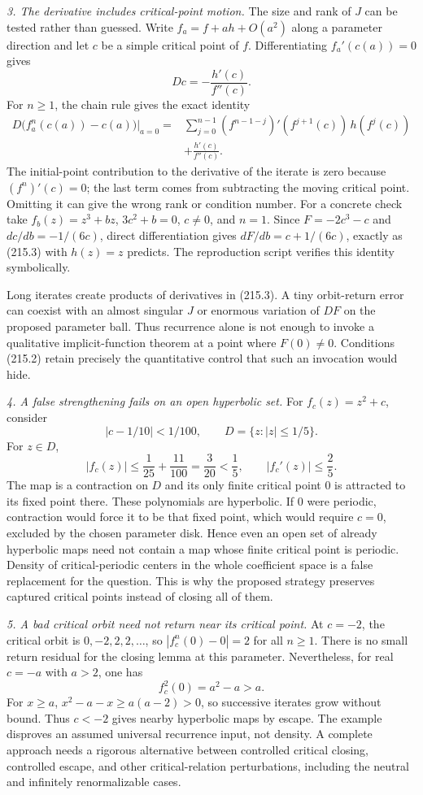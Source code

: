 \documentclass[11pt,a4paper]{article}
\begin{document}
\textit{3. The derivative includes critical-point motion.}
The size and rank of $J$ can be tested rather than guessed. Write
$f_a=f+ah+O(a^2)$ along a parameter direction and let $c$ be a simple
critical point of $f$. Differentiating $f_a'(c(a))=0$ gives
\[
 Dc=-\frac{h'(c)}{f''(c)}.
\]
For $n\ge1$, the chain rule gives the exact identity
\[
 \begin{split}
 D\big(f_a^n(c(a))-c(a)\big)\big|_{a=0}
   ={}&\sum_{j=0}^{n-1}
      (f^{n-1-j})'(f^{j+1}(c))\,h(f^j(c))\\
     &+\frac{h'(c)}{f''(c)}.                              \end{split}\tag{215.3}
\]
The initial-point contribution to the derivative of the iterate is zero
because $(f^n)'(c)=0$; the last term comes from subtracting the moving
critical point. Omitting it can give the wrong rank or condition number.
For a concrete check take $f_b(z)=z^3+bz$, $3c^2+b=0$, $c\ne0$, and
$n=1$. Since $F=-2c^3-c$ and $dc/db=-1/(6c)$, direct differentiation gives
$dF/db=c+1/(6c)$, exactly as (215.3) with $h(z)=z$ predicts.
The reproduction script verifies this identity symbolically.

Long iterates create products of derivatives in (215.3). A tiny orbit-return
error can coexist with an almost singular $J$ or enormous variation of
$DF$ on the proposed parameter ball. Thus recurrence alone is not enough
to invoke a qualitative implicit-function theorem at a point where
$F(0)\ne0$. Conditions (215.2) retain precisely the quantitative control
that such an invocation would hide.

\textit{4. A false strengthening fails on an open hyperbolic set.}
For $f_c(z)=z^2+c$, consider
\[
 |c-1/10|<1/100,\qquad D=\{z:|z|\le1/5\}.
\]
For $z\in D$,
\[
 |f_c(z)|\le\frac1{25}+\frac{11}{100}=\frac3{20}<\frac15,
 \qquad |f_c'(z)|\le\frac25.
\]
The map is a contraction on $D$ and its only finite critical point $0$
is attracted to its fixed point there. These polynomials are hyperbolic.
If $0$ were periodic, contraction would force it to be that fixed point,
which would require $c=0$, excluded by the chosen parameter disk.
Hence even an open set of already hyperbolic maps need not contain a map
whose finite critical point is periodic. Density of critical-periodic
centers in the whole coefficient space is a false replacement for the
question. This is why the proposed strategy preserves captured critical
points instead of closing all of them.

\textit{5. A bad critical orbit need not return near its critical point.}
At $c=-2$, the critical orbit is $0,-2,2,2,\ldots$, so
$|f_c^n(0)-0|=2$ for all $n\ge1$. There is no small return residual
for the closing lemma at this parameter. Nevertheless, for real
$c=-a$ with $a>2$, one has
\[
 f_c^2(0)=a^2-a>a.
\]
For $x\ge a$, $x^2-a-x\ge a(a-2)>0$, so successive iterates grow
without bound. Thus $c<-2$ gives nearby hyperbolic maps by escape.
The example disproves an assumed universal recurrence input, not density.
A complete approach needs a rigorous alternative between controlled
critical closing, controlled escape, and other critical-relation
perturbations, including the neutral and infinitely renormalizable cases.
\end{document}
